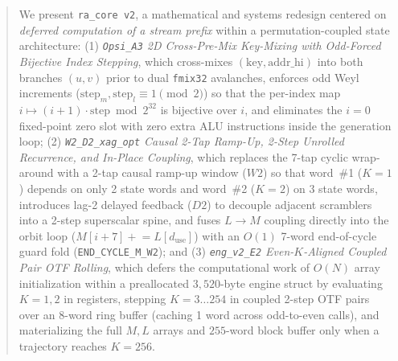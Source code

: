 \documentclass[conference]{IEEEtran}
\begin{document}
\begin{abstract}
We present \texttt{ra\_core v2}, a mathematical and systems redesign centered on \emph{deferred computation of a stream prefix} within a permutation-coupled state architecture: (1) \emph{\texttt{Opsi\_A3} 2D Cross-Pre-Mix Key-Mixing with Odd-Forced Bijective Index Stepping}, which cross-mixes $(\text{key}, \text{addr\_hi})$ into both branches $(u, v)$ prior to dual \texttt{fmix32} avalanches, enforces odd Weyl increments ($\text{step}_m, \text{step}_l \equiv 1 \pmod 2$) so that the per-index map $i \mapsto (i+1)\cdot\text{step} \bmod 2^{32}$ is bijective over $i$, and eliminates the $i=0$ fixed-point zero slot with zero extra ALU instructions inside the generation loop; (2) \emph{\texttt{W2\_D2\_xag\_opt} Causal 2-Tap Ramp-Up, 2-Step Unrolled Recurrence, and In-Place Coupling}, which replaces the 7-tap cyclic wrap-around with a 2-tap causal ramp-up window ($W2$) so that word~\#1 ($K=1$) depends on only 2 state words and word~\#2 ($K=2$) on 3 state words, introduces lag-2 delayed feedback ($D2$) to decouple adjacent scramblers into a 2-step superscalar spine, and fuses $L \to M$ coupling directly into the orbit loop ($M[i+7] \mathrel{+}= L[d_{\text{use}}]$) with an $O(1)$ 7-word end-of-cycle guard fold (\texttt{END\_CYCLE\_M\_W2}); and (3) \emph{\texttt{eng\_v2\_E2} Even-$K$-Aligned Coupled Pair OTF Rolling}, which defers the computational work of $O(N)$ array initialization within a preallocated $3{,}520$-byte engine struct by evaluating $K=1, 2$ in registers, stepping $K=3\ldots 254$ in coupled 2-step OTF pairs over an 8-word ring buffer (caching 1 word across odd-to-even calls), and materializing the full $M, L$ arrays and $255$-word block buffer only when a trajectory reaches $K=256$.


\end{abstract}
\end{document}
